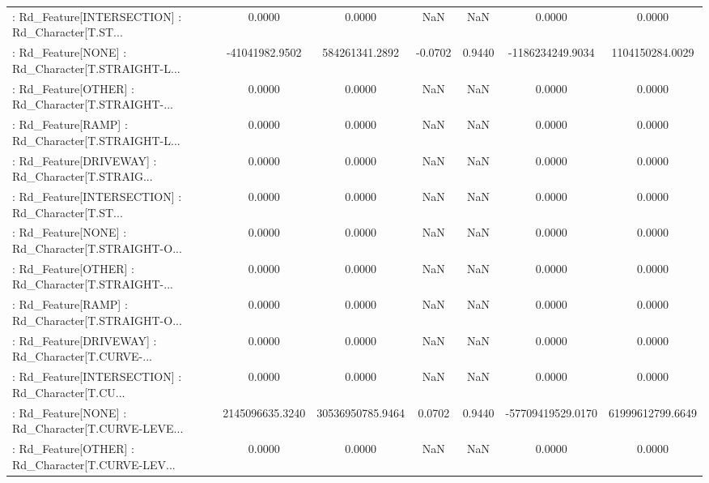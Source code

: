 \begin{longtable}{p{4cm}cccccc}
 : Rd\_Feature[INTERSECTION] : Rd\_Character[T.ST... &            0.0000 &            0.0000 &     NaN &          NaN &             0.0000 &            0.0000 \\
 : Rd\_Feature[NONE] : Rd\_Character[T.STRAIGHT-L... &    -41041982.9502 &    584261341.2892 & -0.0702 &       0.9440 &   -1186234249.9034 &   1104150284.0029 \\
 : Rd\_Feature[OTHER] : Rd\_Character[T.STRAIGHT-... &            0.0000 &            0.0000 &     NaN &          NaN &             0.0000 &            0.0000 \\
 : Rd\_Feature[RAMP] : Rd\_Character[T.STRAIGHT-L... &            0.0000 &            0.0000 &     NaN &          NaN &             0.0000 &            0.0000 \\
 : Rd\_Feature[DRIVEWAY] : Rd\_Character[T.STRAIG... &            0.0000 &            0.0000 &     NaN &          NaN &             0.0000 &            0.0000 \\
 : Rd\_Feature[INTERSECTION] : Rd\_Character[T.ST... &            0.0000 &            0.0000 &     NaN &          NaN &             0.0000 &            0.0000 \\
 : Rd\_Feature[NONE] : Rd\_Character[T.STRAIGHT-O... &            0.0000 &            0.0000 &     NaN &          NaN &             0.0000 &            0.0000 \\
 : Rd\_Feature[OTHER] : Rd\_Character[T.STRAIGHT-... &            0.0000 &            0.0000 &     NaN &          NaN &             0.0000 &            0.0000 \\
 : Rd\_Feature[RAMP] : Rd\_Character[T.STRAIGHT-O... &            0.0000 &            0.0000 &     NaN &          NaN &             0.0000 &            0.0000 \\
 : Rd\_Feature[DRIVEWAY] : Rd\_Character[T.CURVE-... &            0.0000 &            0.0000 &     NaN &          NaN &             0.0000 &            0.0000 \\
 : Rd\_Feature[INTERSECTION] : Rd\_Character[T.CU... &            0.0000 &            0.0000 &     NaN &          NaN &             0.0000 &            0.0000 \\
 : Rd\_Feature[NONE] : Rd\_Character[T.CURVE-LEVE... &   2145096635.3240 &  30536950785.9464 &  0.0702 &       0.9440 &  -57709419529.0170 &  61999612799.6649 \\
 : Rd\_Feature[OTHER] : Rd\_Character[T.CURVE-LEV... &            0.0000 &            0.0000 &     NaN &          NaN &             0.0000 &            0.0000 \\

\end{longtable}
